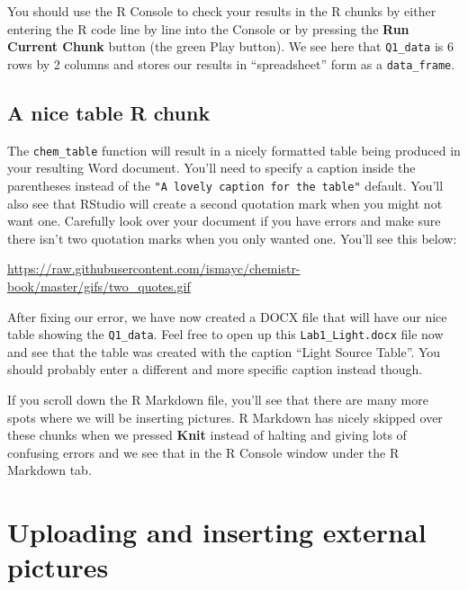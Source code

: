 \documentclass[]{tufte-book}
\begin{document}
\vspace{0.1in}

You should use the R Console to check your results in the R chunks by
either entering the R code line by line into the Console or by pressing
the \textbf{Run Current Chunk} button (the green Play button). We see
here that \texttt{Q1\_data} is 6 rows by 2 columns and stores our
results in ``spreadsheet'' form as a \texttt{data\_frame}.

\subsection{A nice table R chunk}\label{a-nice-table-r-chunk}

The \texttt{chem\_table} function will result in a nicely formatted
table being produced in your resulting Word document. You'll need to
specify a caption inside the parentheses instead of the
\texttt{"A\ lovely\ caption\ for\ the\ table"} default. You'll also see
that RStudio will create a second quotation mark when you might not want
one. Carefully look over your document if you have errors and make sure
there isn't two quotation marks when you only wanted one. You'll see
this below:

\vspace{0.1in}

\begin{center}\footnotesize{\url{https://raw.githubusercontent.com/ismayc/chemistr-book/master/gifs/two_quotes.gif}}\end{center}

\vspace{0.1in}

After fixing our error, we have now created a DOCX file that will have
our nice table showing the \texttt{Q1\_data}. Feel free to open up this
\texttt{Lab1\_Light.docx} file now and see that the table was created
with the caption ``Light Source Table''. You should probably enter a
different and more specific caption instead though.

If you scroll down the R Markdown file, you'll see that there are many
more spots where we will be inserting pictures. R Markdown has nicely
skipped over these chunks when we pressed \textbf{Knit} instead of
halting and giving lots of confusing errors and we see that in the R
Console window under the R Markdown tab.

\section{Uploading and inserting external
pictures}\label{uploading-and-inserting-external-pictures}
\end{document}
